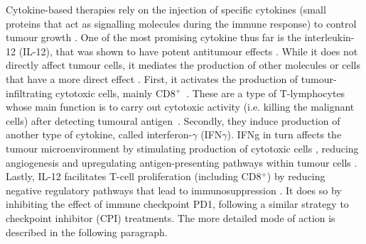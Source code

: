 \documentclass[11pt]{article}
\begin{document}
%
\par Cytokine-based therapies rely on the injection of specific cytokines (small proteins that act as signalling molecules during the immune response) to control tumour growth \cite{ioDef}. One of the most promising cytokine thus far is the interleukin-12 (IL-12), that was shown to have potent antitumour effects \cite{il12IsCool}. While it does not directly affect tumour cells, it mediates the production of other molecules or cells that have a more direct effect \cite{il12CytokineStorm}. First, it activates the production of tumour-infiltrating cytotoxic cells, mainly CD8$^+$~\cite{cd8FirstWay}. These are a type of T-lymphocytes whose main function is to carry out cytotoxic activity (i.e. killing the malignant cells) after detecting tumoural antigen~\cite{cd8Effects}. Secondly, they induce production of another type of cytokine, called interferon-$\gamma$ (IFN$\gamma$). IFNg in turn affects the tumour microenvironment by stimulating production of cytotoxic cells \cite{ifngNKProd}, reducing angiogenesis \cite{ifngAngiogenesis} and upregulating antigen-presenting pathways within tumour cells \cite{ifngAntigenExposure}. Lastly, IL-12 facilitates T-cell proliferation (including CD8$^+$) by reducing negative regulatory pathways that lead to immunosuppression \cite{reducImmunoSuppression}. It does so by inhibiting the effect of immune checkpoint PD1, following a similar strategy to checkpoint inhibitor (CPI) treatments. The more detailed mode of action is described in the following paragraph.
%
\end{document}
